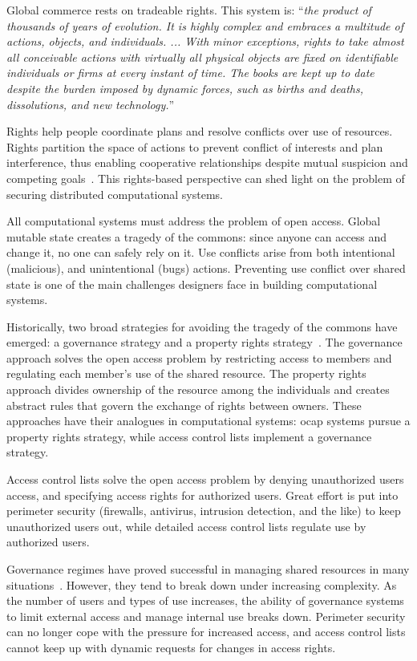 \documentclass{llncs}
\begin{document}
Global commerce rests on tradeable rights. This system is: ``\emph{the product of thousands of years of evolution. It is highly complex and embraces a multitude of actions, objects, and individuals. ... With minor exceptions, rights to take almost all conceivable actions with virtually all physical objects are fixed on identifiable individuals or firms at every instant of time. The books are kept up to date despite the burden imposed by dynamic forces, such as births and deaths, dissolutions, and new technology.}''~\cite{jensen_specific_1995}

Rights help people coordinate plans and resolve conflicts over use of resources. Rights partition the space of actions to prevent conflict of interests and plan interference, thus enabling cooperative relationships despite mutual suspicion and competing goals~\cite{steiner_essay_1994}. This rights-based perspective can shed light on the problem of securing distributed computational systems.

All computational systems must address the problem of open access. Global mutable state creates a tragedy of the commons: since anyone can access and change it, no one can safely rely on it. Use conflicts arise from both intentional (malicious), and unintentional (bugs) actions. Preventing use conflict over shared state is one of the main challenges designers face in building computational systems.

Historically, two broad strategies for avoiding the tragedy of the commons have emerged: a governance strategy and a property rights strategy~\cite{smith_exclusion_2002}. The governance approach solves the open access problem by restricting access to members and regulating each member's use of the shared resource. The property rights approach divides ownership of the resource among the individuals and creates abstract rules that govern the exchange of rights between owners. These approaches have their analogues in computational systems: ocap systems pursue a property rights strategy, while access control lists implement a governance strategy.

Access control lists solve the open access problem by denying unauthorized users access, and specifying access rights for authorized users. Great effort is put into perimeter security (firewalls, antivirus, intrusion detection, and the like) to keep unauthorized users out, while detailed access control lists regulate use by authorized users.

Governance regimes have proved successful in managing shared resources in many situations~\cite{ostrom_governing_1990}. However, they tend to break down under increasing complexity. As the number of users and types of use increases, the ability of governance systems to limit external access and manage internal use breaks down. Perimeter security can no longer cope with the pressure for increased access, and access control lists cannot keep up with dynamic requests for changes in access rights.
\end{document}
